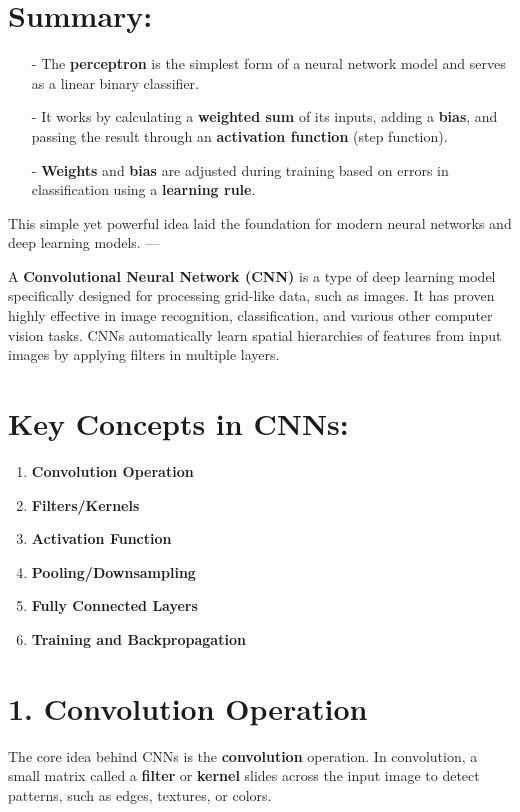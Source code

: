 \documentclass[10pt]{article}
\begin{document}
\section{ Summary:}
\begin{itemize}
   \item [-] The {\bf perceptron} is the simplest form of a neural network model and serves as a linear binary classifier.
   \item [-] It works by calculating a {\bf weighted sum} 
   of its inputs, adding a {\bf bias}, and passing the result 
   through an {\bf activation function} (step function).
   \item [-] {\bf Weights} and {\bf bias} are adjusted 
   during training based on errors in classification 
   using a {\bf learning rule}.
\end{itemize}

This simple yet powerful idea laid the foundation for modern neural networks and deep learning models.
---

A {\bf Convolutional Neural Network (CNN)} is a type of deep learning model specifically designed for processing grid-like data, such as images. It has proven highly effective in image recognition, classification, and various other computer vision tasks. CNNs automatically learn spatial hierarchies of features from input images by applying filters in multiple layers.

\section{ Key Concepts in CNNs:}

\begin{enumerate}
   \item {\bf Convolution Operation}
   \item {\bf Filters/Kernels}
   \item {\bf Activation Function}
   \item {\bf Pooling/Downsampling}
   \item {\bf Fully Connected Layers}
   \item {\bf Training and Backpropagation}
\end{enumerate}

\section{ 1. {\bf Convolution Operation}}
The core idea behind CNNs is the {\bf convolution} operation. 
In convolution, a small matrix called a {\bf filter} or {\bf kernel} slides across the input image to detect patterns, such as edges, textures, or colors.
\end{document}

